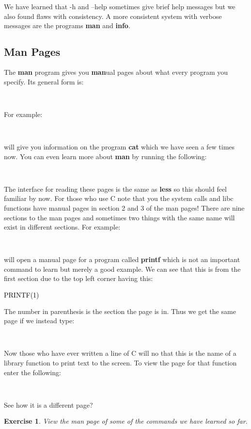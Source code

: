 \documentclass[oneside]{book}
\newcommand{\commandline}[1]{\begin{center} \colorbox{Dark}{\textcolor{white}{#1}} \end{center}}
\newcommand{\exampleout}[1]{\begin{center} \colorbox{Light}{\textcolor{black}{#1}} \end{center}}
\newtheorem{ex}{Exercise}[chapter]
\begin{document}
We have learned that -h and --help sometimes give brief help messages but we also found flaws with consistency. A more consistent system with verbose messages are the programs \textbf{man} and \textbf{info}.
\subsection{Man Pages}
The \textbf{man} program gives you \textbf{man}ual pages about what every program you specify. Its general form is:
\commandline{man programname}
For example:
\commandline{man cat}
will give you information on the program \textbf{cat} which we have seen a few times now. You can even learn more about \textbf{man} by running the following:
\commandline{man}
The interface for reading these pages is the same as \textbf{less} so this should feel familiar by now. For those who use C note that you the system calls and libc functions have manual pages in section 2 and 3 of the man pages! 
There are nine sections to the man pages and sometimes two things with the same name will exist in different sections. For example:
\commandline{man printf}
will open a manual page for a program called \textbf{printf} which is not an important command to learn but merely a good example. We can see that this is from the first section due to the top left corner having this:
\exampleout{PRINTF(1)}
The number in parenthesis is the section the page is in. Thus we get the same page if we instead type:
\commandline{man 1 printf}
Now those who have ever written a line of C will no that this is the name of a library function to print text to the screen. To view the page for that function enter the following:
\commandline{man 3 printf}
See how it is a different page?
\begin{ex}
	View the man page of some of the commands we have learned so far.
\end{ex}
\end{document}
